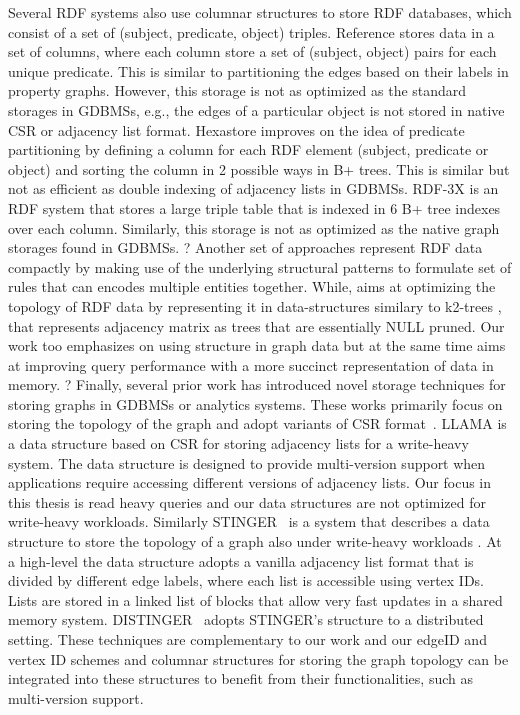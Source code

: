 Several RDF systems also use columnar structures to store RDF databases, which consist of a set of (subject, predicate, object) triples. Reference \cite{rdf-vertical} stores data in a set of columns, where each column store a set of (subject, object) pairs for each unique predicate. This is similar to partitioning the edges based on their labels in property graphs. However, this storage is not as optimized as the standard storages in GDBMSs, e.g., the edges of a particular object is not stored in native CSR or adjacency list format. Hexastore \cite{hexastore} improves on the idea of predicate partitioning by defining a column for each RDF element (subject, predicate or object) and sorting the column in 2 possible ways in B+ trees. This is similar but not as efficient as double indexing of adjacency lists in GDBMSs. RDF-3X \cite{rdf-3x} is an RDF system that stores a large triple table that is indexed in 6 B+ tree indexes over each column. Similarly, this storage is not as optimized as the native graph storages found in GDBMSs.
?
Another set of approaches \cite{comp-rdf, rbcomp, hdt} represent RDF data compactly by making use of the underlying structural patterns to formulate set of rules that can encodes multiple entities together. While, \cite{k2triples, ik2trees} aims at optimizing the topology of RDF data by representing it in data-structures similary to k2-trees \cite{k2trees}, that represents adjacency matrix as trees that are essentially NULL pruned. Our work too emphasizes on using structure in graph data but at the same time aims at improving query performance with a more succinct representation of data in memory.
?
Finally, several prior work has introduced novel storage techniques for storing graphs in GDBMSs or analytics systems. These works primarily focus on storing the topology of the graph and adopt variants of CSR format~\cite{yale}. LLAMA is a data structure based on CSR for storing adjacency lists for a write-heavy system. The data structure is designed to provide multi-version support when applications require accessing different versions of adjacency lists. Our focus in this thesis is read heavy queries and our data structures are not optimized for write-heavy workloads. Similarly STINGER~\cite{stinger} is a system that describes a data structure to store the topology of a graph also under write-heavy workloads . At a high-level the data structure adopts a vanilla adjacency list format that is divided by different edge labels, where each list is accessible using vertex IDs. Lists are stored in a linked list of blocks that allow very fast updates in a shared memory system. DISTINGER~\cite{distinger} adopts STINGER's structure to a distributed setting. These techniques are complementary to our work and our edgeID and vertex ID schemes and columnar structures for storing the graph topology can be integrated into these structures to benefit from their functionalities, such as multi-version support. 
